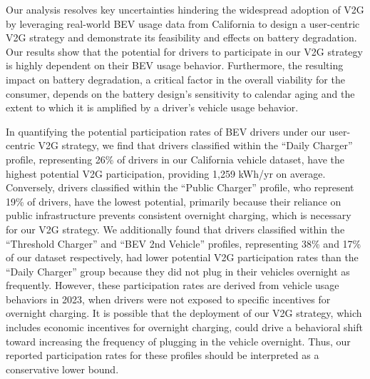 \documentclass[pdflatex,sn-nature]{sn-jnl}%
\theoremstyle{thmstyleone}%
\theoremstyle{thmstyletwo}%
\theoremstyle{thmstylethree}%
\begin{document}
Our analysis resolves key uncertainties hindering the widespread adoption of V2G by leveraging real-world BEV usage data from California to design a user-centric V2G strategy and demonstrate its feasibility and effects on battery degradation. Our results show that the potential for drivers to participate in our V2G strategy is highly dependent on their BEV usage behavior. Furthermore, the resulting impact on battery degradation, a critical factor in the overall viability for the consumer, depends on the battery design’s sensitivity to calendar aging and the extent to which it is amplified by a driver’s vehicle usage behavior.

In quantifying the potential participation rates of BEV drivers under our user-centric V2G strategy, we find that drivers classified within the ``Daily Charger'' profile, representing 26\% of drivers in our California vehicle dataset, have the highest potential V2G participation, providing 1,259 kWh/yr on average. Conversely, drivers classified within the ``Public Charger'' profile, who represent 19\% of drivers, have the lowest potential, primarily because their reliance on public infrastructure prevents consistent overnight charging, which is necessary for our V2G strategy. We additionally found that drivers classified within the ``Threshold Charger'' and ``BEV 2nd Vehicle'' profiles, representing 38\% and 17\% of our dataset respectively, had lower potential V2G participation rates than the ``Daily Charger'' group because they did not plug in their vehicles overnight as frequently. However, these participation rates are derived from vehicle usage behaviors in 2023, when drivers were not exposed to specific incentives for overnight charging. It is possible that the deployment of our V2G strategy, which includes economic incentives for overnight charging, could drive a behavioral shift toward increasing the frequency of plugging in the vehicle overnight. Thus, our reported participation rates for these profiles should be interpreted as a conservative lower bound.
\end{document}
